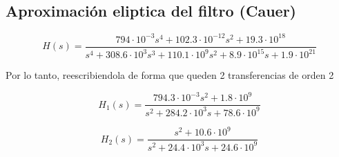\subsection{Aproximación eliptica del filtro (Cauer)}

\[
H(s)=\frac{794\cdot10^{-3}s^{4}+102.3\cdot10^{-12}s^{2}+19.3\cdot10^{18}}{s^{4}+308.6\cdot10^{3}s^{3}+110.1\cdot10^{9}s^{2}+8.9\cdot10^{15}s+1.9\cdot10^{21}}
\]

Por lo tanto, reescribiendola de forma que queden 2 transferencias
de orden 2

\[
H_{1}(s)=\frac{794.3\cdot10^{-3}s^{2}+1.8\cdot10^{9}}{s^{2}+284.2\cdot10^{3}s+78.6\cdot10^{9}}
\]

\[
H_{2}(s)=\frac{s^{2}+10.6\cdot10^{9}}{s^{2}+24.4\cdot10^{3}s+24.6\cdot10^{9}}
\]